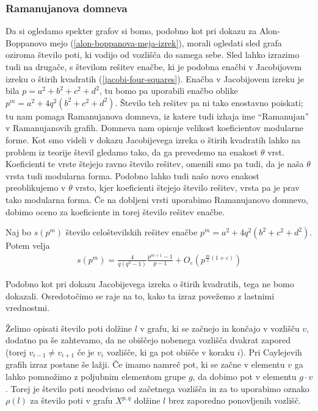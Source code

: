 \subsubsection{Ramanujanova domneva}
Da si ogledamo spekter grafov si bomo, podobno kot pri dokazu za Alon-Boppanovo mejo (\ref{alon-boppanova-meja-izrek}), morali ogledati sled grafa oziroma število poti, ki vodijo od vozlišča do samega sebe. Sled lahko izrazimo tudi na drugače, s številom rešitev enačbe, ki je podobna enačbi v Jacobijovem izreku o štirih kvadratih (\ref{jacobi-four-squares}). Enačba v Jacobijovem izreku je bila \(p=a^2+b^2+c^2+d^2\), tu bomo pa uporabili enačbo oblike \(p^m = a^2 + 4q^2(b^2+c^2+d^2)\). Število teh rešitev pa ni tako enostavno poiskati; tu nam pomaga Ramanujanova domneva, iz katere tudi izhaja ime ``Ramanujan'' v Ramanujanovih grafih. Domneva nam opisuje velikost koeficientov modularne forme. Kot smo videli v dokazu Jacobijevega izreka o štirih kvadratih lahko na problem iz teorije števil gledamo tako, da ga prevedemo na enakost \(\theta\) vrst. Koeficienti te vrste štejejo ravno število rešitev, omenili smo pa tudi, da je naša \(\theta\) vrsta tudi modularna forma. Podobno lahko tudi našo novo enakost preoblikujemo v \(\theta\) vrsto, kjer koeficienti štejejo število rešitev, vrsta pa je prav tako modularna forma. Če na dobljeni vrsti uporabimo Ramanujanovo domnevo, dobimo oceno za koeficiente in torej število rešitev enačbe. 

\begin{izrek}
    Naj bo \(s(p^m)\) število celoštevilskih rešitev enačbe \(p^m = a^2+4q^2(b^2+c^2+d^2)\).
    Potem velja
    \begin{align*}
        s(p^m) = \frac{4}{q(q^2-1)}\frac{p^{m+1}-1}{p-1} + O_\varepsilon \left(p^{\frac{m}{2}(1+\varepsilon)}\right)
    \end{align*}
\end{izrek}
Podobno kot pri dokazu Jacobijevega izreka o štirih kvadratih, tega ne bomo dokazali. Osredotočimo se raje na to, kako ta izraz povežemo z lastnimi vrednostmi. 

Želimo opisati število poti dolžine \(l\) v grafu, ki se začnejo in končajo v vozlišču \(v\), dodatno pa še zahtevamo, da ne obiščejo nobenega vozlišča dvakrat zapored (torej \(v_{i-1}\neq v_{i+1}\) če je \(v_i\) vozlišče, ki ga pot obišče v koraku \(i\)). Pri Caylejevih grafih izraz postane še lažji. Če imamo namreč pot, ki se začne v elementu \(v\) ga lahko pomnožimo z poljubnim elementom grupe \(g\), da dobimo pot v elementu \(g\cdot v\). Torej je število poti neodvisno od začetnega vozlišča in za to uporabimo oznako \(\rho(l)\) za število poti v grafu \(X^{p,q}\) dolžine \(l\) brez zaporedno ponovljenih vozlišč.

